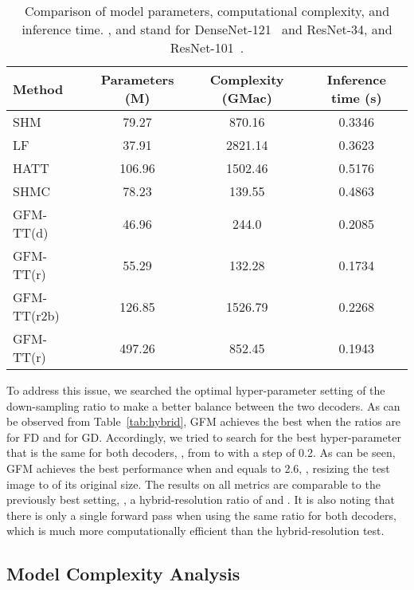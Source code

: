 \documentclass[twocolumn]{svjour3}
\begin{document}
\begin{table*}[htb]
\caption{Comparison of model parameters, computational complexity, and inference time. ,  and  stand for DenseNet-121~\citep{huang2017densely} and ResNet-34, and ResNet-101~\citep{he2016deep}.}
\begin{center}
\begin{tabular}{l|ccc}
\hline
Method & Parameters (M) & Complexity (GMac) & Inference time (s)  \\
\hline
 SHM~\citep{chen2018semantic} & 79.27 &870.16 & 0.3346\\
 LF~\citep{zhang2019late} &37.91  & 2821.14& 0.3623\\
 HATT~\citep{Qiao_2020_CVPR} &106.96 &1502.46 & 0.5176\\
 SHMC~\citep{liu2020boosting} &78.23 &139.55 &0.4863 \\
 GFM-TT(d) & 46.96  & 244.0& 0.2085\\
 GFM-TT(r) & 55.29  & 132.28 & 0.1734\\
 GFM-TT(r2b) & 126.85  & 1526.79 &0.2268\\
 GFM-TT(r) & 497.26& 852.45& 0.1943\\
\hline
\end{tabular}
\end{center}
\label{Tab:run_time_parameters}
\end{table*}

To address this issue, we searched the optimal hyper-parameter setting of the down-sampling ratio to make a better balance between the two decoders. As can be observed from Table~\ref{tab:hybrid}, GFM achieves the best when the ratios are  for FD and  for GD. Accordingly, we tried to search for the best hyper-parameter that is the same for both decoders, , from  to  with a step of 0.2. As can be seen, GFM achieves the best performance when  and equals to 2.6, , resizing the test image to  of its original size. The results on all metrics are comparable to the previously best setting, , a hybrid-resolution ratio of  and . It is also noting that there is only a single forward pass when using the same ratio for both decoders, which is much more computationally efficient than the hybrid-resolution test.


\subsection{Model Complexity Analysis}
\label{sec: complexity}
\end{document}
